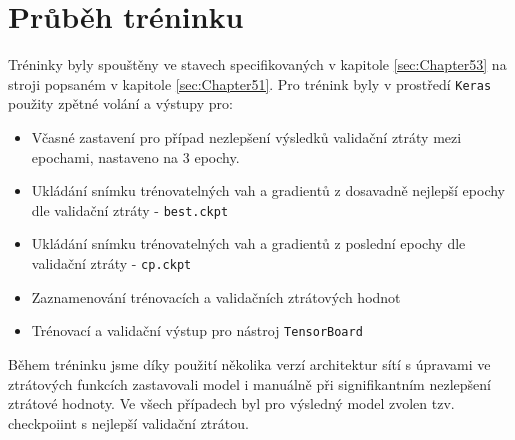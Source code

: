 \section{Průběh tréninku}
\label{sec:Chapter54}
Tréninky byly spouštěny ve stavech specifikovaných v kapitole \ref{sec:Chapter53} na stroji popsaném v kapitole \ref{sec:Chapter51}. Pro trénink byly v prostředí \texttt{Keras} použity zpětné volání a výstupy pro:
\begin{itemize}
    \item Včasné zastavení pro případ nezlepšení výsledků validační ztráty mezi epochami, nastaveno na 3 epochy.
    \item Ukládání snímku trénovatelných vah a gradientů z dosavadně nejlepší epochy dle validační ztráty - \texttt{best.ckpt}
    \item Ukládání snímku trénovatelných vah a gradientů z poslední epochy dle validační ztráty - \texttt{cp.ckpt}
    \item Zaznamenování trénovacích a validačních ztrátových hodnot
    \item Trénovací a validační výstup pro nástroj \texttt{TensorBoard}
\end{itemize}
Během tréninku jsme díky použití několika verzí architektur sítí s úpravami ve ztrátových funkcích zastavovali model i manuálně při signifikantním nezlepšení ztrátové hodnoty. Ve všech případech byl pro výsledný model zvolen tzv. checkpoiint s nejlepší validační ztrátou.
\endinput